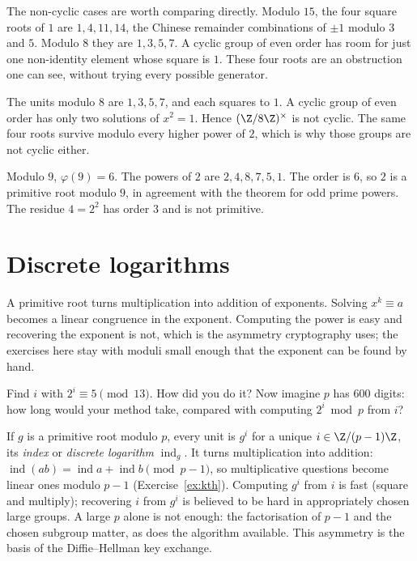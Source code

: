 The non-cyclic cases are worth comparing directly. Modulo $15$, the four
square roots of $1$ are $1,4,11,14$, the Chinese remainder combinations of
$\pm1$ modulo $3$ and $5$. Modulo $8$ they are $1,3,5,7$.
A cyclic group of even order has room for just one non-identity element whose
square is $1$. These four roots are an obstruction one can see, without
trying every possible generator.

\begin{examplex}
The units modulo $8$ are $1,3,5,7$, and each squares to $1$. A cyclic group of even order has only two solutions of $x^2=1$. Hence $(\Z/8\Z)^\times$ is not cyclic. The same four roots survive modulo every higher power of $2$, which is why those groups are not cyclic either.
\end{examplex}

\begin{examplex}
Modulo $9$, $\varphi(9)=6$. The powers of $2$ are $2,4,8,7,5,1$. The order is $6$, so $2$ is a primitive root modulo $9$, in agreement with the theorem for odd prime powers. The residue $4=2^2$ has order $3$ and is not primitive.
\end{examplex}

\section{Discrete logarithms}

A primitive root turns multiplication into addition of exponents. Solving $x^k\equiv a$ becomes a linear congruence in the exponent. Computing the power is easy and recovering the exponent is not, which is the asymmetry cryptography uses; the exercises here stay with moduli small enough that the exponent can be found by hand.

\begin{think}
Find $i$ with $2^i\equiv5\pmod{13}$. How did you do it? Now imagine $p$ has $600$ digits: how long would your method take, compared with computing $2^i\bmod p$ from $i$?
\end{think}

If $g$ is a primitive root modulo $p$, every unit is $g^i$ for a unique $i\in\Z/(p-1)\Z$, its \emph{index} or \emph{discrete logarithm} $\operatorname{ind}_g$. It turns multiplication into addition: $\operatorname{ind}(ab)=\operatorname{ind}a+\operatorname{ind}b\pmod{p-1}$, so multiplicative questions become linear ones modulo $p-1$ (Exercise~\ref{ex:kth}).
Computing $g^i$ from $i$ is fast (square and multiply); recovering $i$ from $g^i$ is believed to be hard in appropriately chosen large groups. A large $p$ alone is not enough: the factorisation of $p-1$ and the chosen subgroup matter, as does the algorithm available. This asymmetry is the basis of the Diffie--Hellman key exchange.

